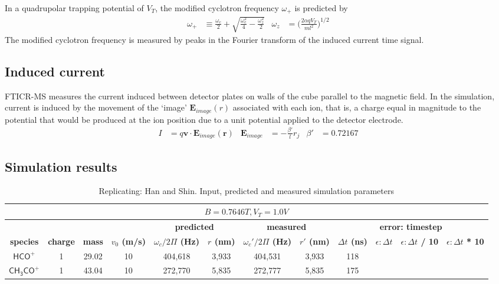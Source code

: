 \documentclass[10pt,conference,onecolumn]{IEEEtran}
\begin{document}
In a quadrupolar trapping potential of $V_T$, the modified cyclotron frequency $\omega_+$ is predicted by
\begin{align}
\omega_+ & \equiv \frac{\omega_c}{2} + \sqrt{\frac{\omega_c^2}{4} - \frac{\omega_z^2}{2}} &
\omega_z &= \biggl(\frac{2 \alpha q V_T}{m l^2}\biggr)^{1/2}
\end{align}
The modified cyclotron frequency is measured by peaks in the Fourier transform of the induced current time signal.

\subsection{Induced current}

FTICR-MS measures the current induced between detector plates on walls of the cube parallel to the magnetic field.
In the simulation, current is induced by the movement of the `image' $\mathbf{E}_{image}(r)$ associated with each ion, that is, a charge equal in magnitude to the potential that would be produced at the ion position due to a unit potential applied to the detector electrode\cite{Guan1995}.
\begin{align}
I &= q\mathbf{v} \cdot \mathbf{E}_{image}(\mathbf{r}) & \mathbf{E}_{image} &= - \frac{\beta'}{l} r_j & \beta' &= 0.72167
\end{align}

\subsection{Simulation results}

\begin{table}[htbp]
 \centering	  	  
 \caption{Replicating: Han and Shin\cite{Han1997}. Input, predicted and measured simulation parameters}
\label{tab:han}
\begin{tabular}{c|c|c|c|c|c|c|c|c|c|c|c}
 \hline \hline
  \multicolumn{12}{|c|}{$B = 0.7646 T, V_T = 1.0 V$} \\
 \hline \hline
 \multicolumn{4}{|c|}{ } & \multicolumn{2}{|c|}{\textbf{predicted}} & \multicolumn{2}{|c|}{\textbf{measured}} & \multicolumn{4}{|c|}{\textbf{error: timestep}} \\ 
 \hline
 \textbf{species} & \textbf{charge} & \textbf{mass} & \textbf{$v_0$ (m/s)} & \textbf{$\omega_c / 2\Pi$ (Hz)} & \textbf{$r$ (nm)} & \textbf{$\omega_c' / 2\Pi$ (Hz)}  & \textbf{$r'$ (nm)} & \textbf{$\Delta t$ (ns)} & \textbf{$\epsilon: \Delta t$}& \textbf{$\epsilon: \Delta t$ / 10} & \textbf{$\epsilon: \Delta t$ * 10}\\ 
 \hline
 $\mathsf{HCO^+}$ & 1 & 29.02 & 10 & 404,618 & 3,933 & 404,531 & 3,933 & 118 & \\
 $\mathsf{CH_3CO^+}$ & 1 & 43.04 & 10 & 272,770 & 5,835 & 272,777 & 5,835 & 175 & \\
 \hline \hline
\end{tabular}
\end{table}
\end{document}
